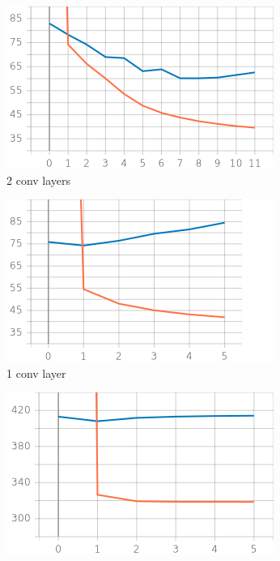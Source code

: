 \begin{figure}[H]
	\centering
	\begin{subfigure}[b]{0.3\linewidth}
		\includegraphics[width=\linewidth]{plots/cnn-training-history-2_conv_layers_deflating_kernel_size_7.png}
		\caption{2 conv layers}
	\end{subfigure}
	\begin{subfigure}[b]{0.3\linewidth}
		\includegraphics[width=\linewidth]{plots/cnn-training-history-1_conv_layers_deflating_kernel_size_7.png}
		\caption{1 conv layer}
	\end{subfigure}
	\begin{subfigure}[b]{0.3\linewidth}
		\includegraphics[width=\linewidth]{plots/cnn-training-history-0_conv_layers_deflating_kernel_size_-1.png}

\end{subfigure}
\end{figure}
